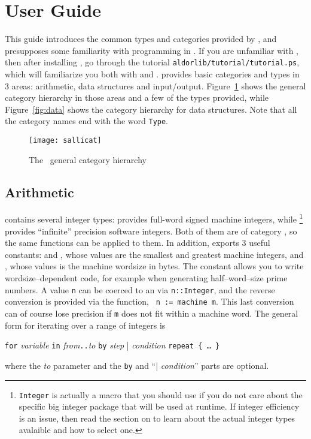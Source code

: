 \section{User Guide}

This guide introduces the common types and categories provided by \libaldor,
and presupposes some familiarity with programming in \aldor.
If you are unfamiliar with \aldor, then after installing \libaldor, go
through the tutorial
{\tt aldorlib/tutorial/tutorial.ps}, which will familiarize you both with
\aldor and \libaldor.
\libaldor{} provides basic categories and types in 3 areas:
arithmetic, data structures and input/output. Figure~\ref{fig:cats} shows the
general category hierarchy in those areas and a few of the types provided,
while Figure~\ref{fig:data} shows the category hierarchy for
data structures.
Note that all the category names end with the word {\tt Type}.

\begin{figure}[htb!]
\begin{latexonly}
\end{latexonly}
\begin{htmlonly}
\texttt{[image: sallicat]}
\end{htmlonly}
\caption{The \libaldor{}~general category hierarchy}
\label{fig:cats}
\end{figure}

\subsection{Arithmetic}
\libaldor{} contains several integer types:
 provides full-word signed machine integers,
while \Integer{}
\footnote{{\tt Integer} is actually a macro that you should
use if you do not care about the specific big integer package that
will be used at runtime. If integer efficiency is an issue, then read
the section on  to learn about the actual
integer types avalaible and how to select one.}
provides ``infinite'' precision software integers.
Both of them are of category ,
so the same functions can be applied to them.
In addition,  exports 3 useful
constants: 
and , whose values are the smallest and
greatest machine integers,
and , whose values is the
machine wordsize in bytes.
The  constant allows you to write
wordsize--dependent code, for example when generating half--word--size prime
numbers. A  value {\tt n}
can be coerced to an \Integer{} via {\tt n::Integer}, and the reverse
conversion is provided via the  function,
\ie~{\tt n := machine m}. This last conversion can
of course lose precision if {\tt m} does not fit within a machine word.
The general form for iterating over a range of integers is\\
\centerline{ {\tt for} {\em variable} {\tt in} {\em from}{\tt..}{\em to}
{\tt by} {\em step} | {\em condition} {\tt repeat \{ \dots~\}} }
where the {\em to} parameter and the {\tt by} and ``| {\em condition}''
parts are optional.

